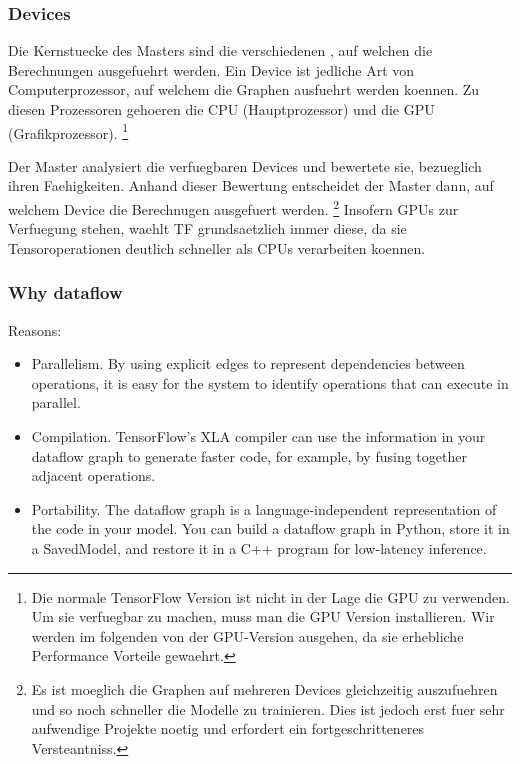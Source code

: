 \subsubsection{Devices}
Die Kernstuecke des Masters sind die verschiedenen , auf
welchen die Berechnungen ausgefuehrt werden. Ein Device ist jedliche Art von
Computerprozessor, auf welchem die Graphen ausfuehrt werden koennen.
Zu diesen Prozessoren gehoeren die CPU (Hauptprozessor) und die GPU (Grafikprozessor).
\footnote{
  Die normale TensorFlow Version ist nicht in der Lage die GPU zu verwenden. Um
  sie verfuegbar zu machen, muss man die GPU Version installieren. Wir werden im folgenden
  von der GPU-Version ausgehen, da sie erhebliche Performance Vorteile gewaehrt.
}
\para{}

Der Master analysiert die verfuegbaren Devices und bewertete sie, bezueglich
ihren Faehigkeiten. Anhand dieser Bewertung entscheidet der Master dann, auf
welchem Device die Berechnugen ausgefuert werden.
\footnote{
  Es ist moeglich die Graphen auf mehreren Devices gleichzeitig auszufuehren und
  so noch schneller die Modelle zu trainieren. Dies ist jedoch erst fuer sehr
  aufwendige Projekte noetig und erfordert ein fortgeschritteneres Versteantniss.
}
Insofern GPUs zur Verfuegung stehen, waehlt TF grundsaetzlich immer diese, da
sie Tensoroperationen deutlich schneller als CPUs verarbeiten koennen.

\subsubsection{Why dataflow}
Reasons:
\begin{itemize}
\item{Parallelism. By using explicit edges to represent dependencies between operations, it is easy for the system to identify operations that can execute in parallel.}
\item{Compilation. TensorFlow's XLA compiler can use the information in your dataflow graph to generate faster code, for example, by fusing together adjacent operations.}
\item{Portability. The dataflow graph is a language-independent representation of the code in your model. You can build a dataflow graph in Python, store it in a SavedModel, and restore it in a C++ program for low-latency inference.}
\end{itemize}

